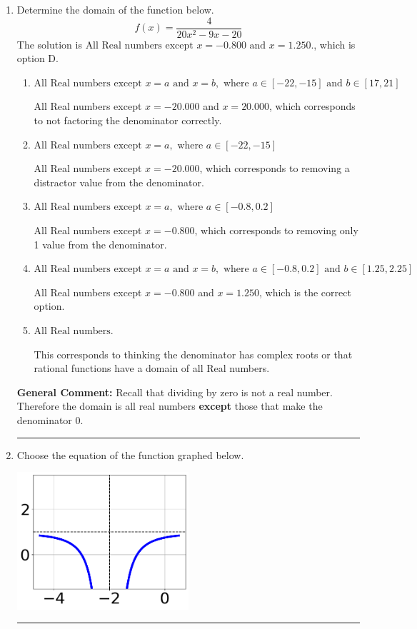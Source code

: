 \documentclass{extbook}[14pt]
\newcommand{\litem}[1]{\item #1

\rule{\textwidth}{0.4pt}}
\begin{document}
\begin{enumerate}\litem{
Determine the domain of the function below.
\[ f(x) = \frac{4}{20x^{2} -9 x -20} \]The solution is \( \text{All Real numbers except } x = -0.800 \text{ and } x = 1.250. \), which is option D.\begin{enumerate}[label=\Alph*.]
\item \( \text{All Real numbers except } x = a \text{ and } x = b, \text{ where } a \in [-22, -15] \text{ and } b \in [17, 21] \)

All Real numbers except $x = -20.000$ and $x = 20.000$, which corresponds to not factoring the denominator correctly.
\item \( \text{All Real numbers except } x = a, \text{ where } a \in [-22, -15] \)

All Real numbers except $x = -20.000$, which corresponds to removing a distractor value from the denominator.
\item \( \text{All Real numbers except } x = a, \text{ where } a \in [-0.8, 0.2] \)

All Real numbers except $x = -0.800$, which corresponds to removing only 1 value from the denominator.
\item \( \text{All Real numbers except } x = a \text{ and } x = b, \text{ where } a \in [-0.8, 0.2] \text{ and } b \in [1.25, 2.25] \)

All Real numbers except $x = -0.800$ and $x = 1.250$, which is the correct option.
\item \( \text{All Real numbers.} \)

This corresponds to thinking the denominator has complex roots or that rational functions have a domain of all Real numbers.
\end{enumerate}

\textbf{General Comment:} Recall that dividing by zero is not a real number. Therefore the domain is all real numbers \textbf{except} those that make the denominator 0.
}
\litem{
Choose the equation of the function graphed below.

\begin{center}
    \includegraphics[width=0.5\textwidth]{../Figures/rationalGraphToEquationCopyA.png}
\end{center}


}
\end{enumerate}
\end{document}
